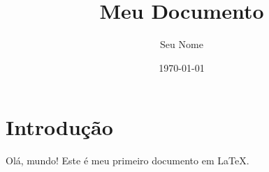 \documentclass{article}
\title{Meu Documento}
\author{Seu Nome}
\date{\today}
\begin{document}
\maketitle

\section{Introdução}
Olá, mundo! Este é meu primeiro documento em \LaTeX.
\end{document}
